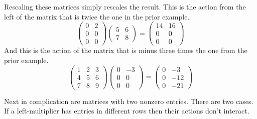 \begin{example}
Rescaling these matrices simply rescales the result. 
This is the action from the left of the matrix that is twice the one in the
prior example.
\begin{equation*}
    \begin{pmatrix}
       0  &2  \\
       0  &0  \\
       0  &0
    \end{pmatrix}
    \begin{pmatrix}
       5  &6  \\
       7  &8
    \end{pmatrix}
  =
    \begin{pmatrix}
      14  &16 \\
       0  &0  \\
       0  &0
    \end{pmatrix}
\end{equation*}
And this is the action of the matrix that is minus three times the one 
from the prior example.
\begin{equation*}
    \begin{pmatrix}
       1  &2  &3  \\
       4  &5  &6  \\
       7  &8  &9
    \end{pmatrix}
    \begin{pmatrix}
       0  &-3 \\
       0  &0  \\
       0  &0
    \end{pmatrix}
  =
    \begin{pmatrix}
       0  &-3  \\
       0  &-12 \\
       0  &-21
    \end{pmatrix}
\end{equation*}
\end{example}

Next in complication are matrices with two nonzero entries.
There are two cases.
If a left-multiplier has entries in different rows then their actions 
don't interact.

